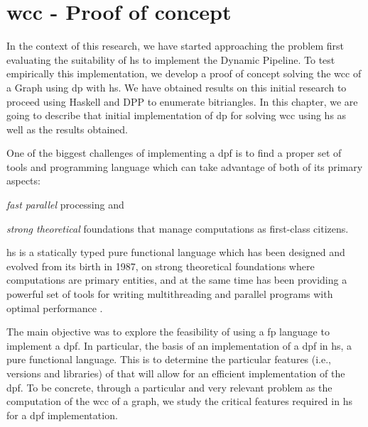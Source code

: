 \chapter{\acrshort{wcc} - Proof of concept}\label{prole}
In the context of this research, we have started approaching the problem first evaluating the suitability of \acrlong{hs}
to implement the Dynamic Pipeline. To test empirically this implementation, we develop a proof of concept solving the \acrlong{wcc} of a Graph using \acrlong{dp} with \acrshort{hs}.
We have obtained results on this initial research to proceed using Haskell and DPP to enumerate bitriangles.
In this chapter, we are going to describe that initial implementation of \acrshort{dp} for solving \acrshort{wcc} using \acrshort{hs} as well as the results obtained.

One of the biggest challenges of implementing a \acrfull{dpf} is to find a proper set of tools and programming language which can take advantage of both of its primary aspects: \begin{inparaenum}[i\upshape)]
\item  \emph{fast parallel} processing and 
\item  \emph{strong theoretical} foundations that manage computations as first-class citizens.
 \end{inparaenum}
\acrfull{hs} is a statically typed pure functional language which has been designed and evolved from its birth in 1987, on strong theoretical foundations where computations are primary entities, 
and at the same time has been providing a powerful set of tools for writing multithreading and parallel programs with optimal performance \cite{parallelbook, monadpar}.

The main objective was to explore the feasibility of using a  \acrfull{fp} language to implement a \acrshort{dpf}. 
In particular, the basis of an implementation of a \acrshort{dpf}  in \acrshort{hs}, a pure functional language. 
This is to determine the particular features (i.e., versions and libraries) of that will allow for an efficient implementation of the \acrshort{dpf}. To be concrete, through a particular and very relevant problem as the computation of the \acrfull{wcc} of a graph,  we study the critical features required in \acrshort{hs} for a \acrshort{dpf} implementation.

